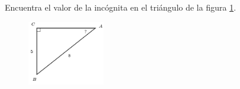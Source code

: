 \question[15]  Encuentra el valor de la incógnita en el triángulo de la figura \ref{fig:angle_functrig_04}.
\begin{figure}[H]
    \begin{center}
        \includegraphics[width=0.3\textwidth]{../images/angle_functrig_04.png}
    \end{center}
    \caption{}
    \label{fig:angle_functrig_04}
\end{figure}